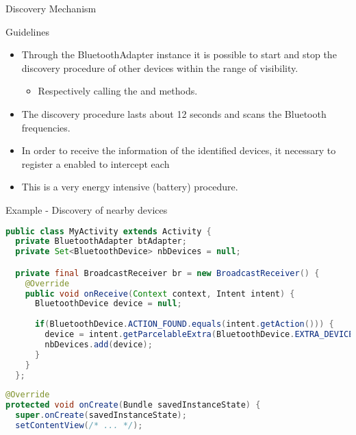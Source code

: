 \documentclass{beamer}
\begin{document}
  \begin{frame}{Discovery Mechanism}
    \begin{block}{Guidelines}
      \begin{itemize}\itemsep10pt
        \item Through the BluetoothAdapter instance it is possible to start and
        stop the discovery procedure of other devices within the range of
        visibility.
        \begin{itemize}
          \item Respectively calling the  and
           methods.
        \end{itemize}
        \item The discovery procedure lasts about 12 seconds and scans the
        Bluetooth frequencies.
        \item In order to receive the information of the identified devices, it
        necessary to register a  enabled to intercept each
         
        \item This is a very energy intensive (battery) procedure.
      \end{itemize}
    \end{block}
    
    \begin{exampleblock}{Example - Discovery of nearby devices}
      \begin{lstlisting}[language=Java]
public class MyActivity extends Activity {
  private BluetoothAdapter btAdapter;
  private Set<BluetoothDevice> nbDevices = null;

  private final BroadcastReceiver br = new BroadcastReceiver() {
    @Override
    public void onReceive(Context context, Intent intent) {
      BluetoothDevice device = null;
      
      if(BluetoothDevice.ACTION_FOUND.equals(intent.getAction())) {
        device = intent.getParcelableExtra(BluetoothDevice.EXTRA_DEVICE);
        nbDevices.add(device);
      }
    }
  };
      \end{lstlisting}
    \end{exampleblock}		
    \begin{exampleblock}{\vspace{-10pt}}
      \begin{lstlisting}[language=Java]
@Override
protected void onCreate(Bundle savedInstanceState) {
  super.onCreate(savedInstanceState);
  setContentView(/* ... */);


\end{lstlisting}
\end{exampleblock}
\end{frame}
\end{document}
